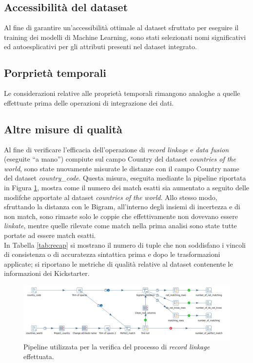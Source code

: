 \subsection{Accessibilità del dataset}
Al fine di garantire un'accessibilità ottimale al dataset sfruttato per eseguire il training dei modelli di Machine Learning, sono stati selezionati nomi significativi ed autoesplicativi per gli attributi presenti nel dataset integrato.

\subsection{Porprietà temporali}
Le considerazioni relative alle proprietà temporali rimangono analoghe a quelle effettuate prima delle operazioni di integrazione dei dati.

\subsection{Altre misure di qualità}
Al fine di verificare l'efficacia dell'operazione di \textit{record linkage} e \textit{data fusion} (eseguite “a mano”) compiute sul campo Country del dataset \textit{countries of the world}, sono state nuovamente misurate le distanze con il campo Country name del dataset \textit{country\_code}. Questa misura, eseguita mediante la pipeline riportata in Figura \ref{fig:qdtrecordlinkage}, mostra come il numero dei match esatti sia aumentato a seguito delle modifche apportate al dataset \textit{countries of the world}. Allo stesso modo, sfruttando la distanza con le Bigram, all'interno degli insiemi di incertezza e di non match, sono rimaste solo le coppie che effettivamente non dovevano essere \textit{linkate}, mentre quelle rilevate come match nella prima analisi sono state tutte portate ad essere match esatti.\\
In Tabella \ref{tab:recap} si mostrano il numero di tuple che non soddisfano i vincoli di consistenza o di accuratezza sintattica prima e dopo le trasformazioni applicate; si riportano le metriche di qualità relative al dataset contenente le informazioni dei Kickstarter.
\begin{figure}[h!]
	\centering
	\includegraphics[width=1\linewidth]{images/QDT_recordlinkage}
	\caption{Pipeline utilizzata per la verifica del processo di \textit{record linkage} effettuata.}
	\label{fig:qdtrecordlinkage}
\end{figure}
